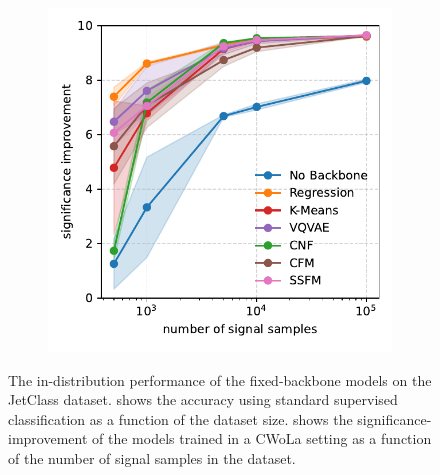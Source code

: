 \begin{figure}[h!]
\begin{subfigure}[b]{0.32\textwidth}
        \includegraphics[width=\linewidth]{Figures/foundation_models/mpm2/final/cwola_frozen.pdf}
        \caption{}
        \label{fig:cwola_fixed}
    \end{subfigure}
    \caption{The in-distribution performance of the fixed-backbone models on the JetClass dataset.  shows the accuracy using standard supervised classification as a function of the dataset size.   shows the significance-improvement of the models trained in a CWoLa setting as a function of the number of signal samples in the dataset.}
    \label{fig:indist_fixed}
\end{figure}

